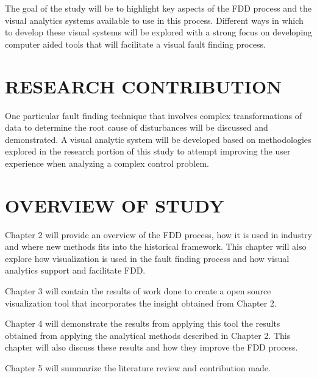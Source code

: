 The goal of the study will be to highlight key aspects of the FDD process and the visual analytics systems available to use in this process. Different ways in which to develop these visual systems will be explored with a strong focus on developing computer aided tools that will facilitate a visual fault finding process.

\section{RESEARCH CONTRIBUTION}

One particular fault finding technique that involves complex transformations of data to determine the root cause of disturbances will be discussed and demonstrated. A visual analytic system will be developed based on methodologies explored in the research portion of this study to attempt improving the user experience when analyzing a complex control problem.

\section{OVERVIEW OF STUDY}

Chapter 2 will provide an overview of the FDD process, how it is used in industry and where new methods fits into the historical framework. This chapter will also explore how visualization is used in the fault finding process and how visual analytics support and facilitate FDD.

Chapter 3 will contain the results of work done to create a open source visualization tool that incorporates the insight obtained from Chapter 2.

Chapter 4 will demonstrate the results from applying this tool the results obtained from applying the analytical methods described in Chapter 2. This chapter will also discuss these results and how they improve the FDD process.

Chapter 5 will summarize the literature review and contribution made.



